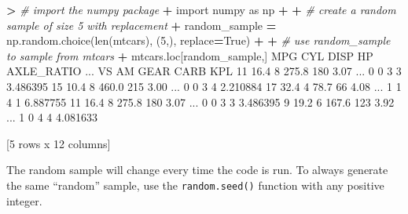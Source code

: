 \documentclass[
]{book}
\newenvironment{Shaded}{\begin{snugshade}}{\end{snugshade}}
\newcommand{\BuiltInTok}[1]{#1}
\newcommand{\CommentTok}[1]{\textcolor[rgb]{0.56,0.35,0.01}{\textit{#1}}}
\newcommand{\DecValTok}[1]{\textcolor[rgb]{0.00,0.00,0.81}{#1}}
\newcommand{\FloatTok}[1]{\textcolor[rgb]{0.00,0.00,0.81}{#1}}
\newcommand{\ImportTok}[1]{#1}
\newcommand{\NormalTok}[1]{#1}
\newcommand{\OperatorTok}[1]{\textcolor[rgb]{0.81,0.36,0.00}{\textbf{#1}}}
\newcommand{\VariableTok}[1]{\textcolor[rgb]{0.00,0.00,0.00}{#1}}
\begin{document}
\begin{Shaded}
\begin{Highlighting}[]
\OperatorTok{\textgreater{}} \CommentTok{\# import the numpy package}
\OperatorTok{+} \ImportTok{import}\NormalTok{ numpy }\ImportTok{as}\NormalTok{ np}
\OperatorTok{+} 
\OperatorTok{+} \CommentTok{\# create a random sample of size 5 with replacement}
\OperatorTok{+}\NormalTok{ random\_sample }\OperatorTok{=}\NormalTok{ np.random.choice(}\BuiltInTok{len}\NormalTok{(mtcars), (}\DecValTok{5}\NormalTok{,), replace}\OperatorTok{=}\VariableTok{True}\NormalTok{)}
\OperatorTok{+} 
\OperatorTok{+} \CommentTok{\# use random\_sample to sample from mtcars}
\OperatorTok{+}\NormalTok{ mtcars.loc[random\_sample,]}
\NormalTok{     MPG  CYL   DISP   HP  AXLE\_RATIO  ...  VS  AM  GEAR CARB       KPL}
\DecValTok{11}  \FloatTok{16.4}    \DecValTok{8}  \FloatTok{275.8}  \DecValTok{180}        \FloatTok{3.07}\NormalTok{  ...   }\DecValTok{0}   \DecValTok{0}     \DecValTok{3}    \DecValTok{3}  \FloatTok{3.486395}
\DecValTok{15}  \FloatTok{10.4}    \DecValTok{8}  \FloatTok{460.0}  \DecValTok{215}        \FloatTok{3.00}\NormalTok{  ...   }\DecValTok{0}   \DecValTok{0}     \DecValTok{3}    \DecValTok{4}  \FloatTok{2.210884}
\DecValTok{17}  \FloatTok{32.4}    \DecValTok{4}   \FloatTok{78.7}   \DecValTok{66}        \FloatTok{4.08}\NormalTok{  ...   }\DecValTok{1}   \DecValTok{1}     \DecValTok{4}    \DecValTok{1}  \FloatTok{6.887755}
\DecValTok{11}  \FloatTok{16.4}    \DecValTok{8}  \FloatTok{275.8}  \DecValTok{180}        \FloatTok{3.07}\NormalTok{  ...   }\DecValTok{0}   \DecValTok{0}     \DecValTok{3}    \DecValTok{3}  \FloatTok{3.486395}
\DecValTok{9}   \FloatTok{19.2}    \DecValTok{6}  \FloatTok{167.6}  \DecValTok{123}        \FloatTok{3.92}\NormalTok{  ...   }\DecValTok{1}   \DecValTok{0}     \DecValTok{4}    \DecValTok{4}  \FloatTok{4.081633}

\NormalTok{[}\DecValTok{5}\NormalTok{ rows x }\DecValTok{12}\NormalTok{ columns]}
\end{Highlighting}
\end{Shaded}

The random sample will change every time the code is run. To always generate the same ``random'' sample, use the \texttt{random.seed()} function with any positive integer.
\end{document}
